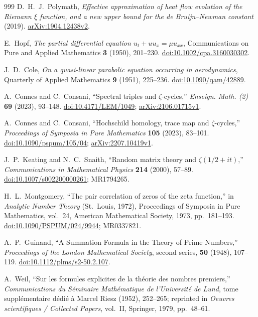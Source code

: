 \begin{thebibliography}{999}
D.~H.~J.~Polymath,
\emph{Effective approximation of heat flow evolution of the Riemann $\xi$
function, and a new upper bound for the de Bruijn--Newman constant} (2019).
\href{https://arxiv.org/abs/1904.12438}{arXiv:1904.12438v2}.

E.~Hopf,
\emph{The partial differential equation $u_t+uu_x=\mu u_{xx}$},
Communications on Pure and Applied Mathematics \textbf{3}
(1950), 201--230.
\href{https://doi.org/10.1002/cpa.3160030302}{doi:10.1002/cpa.3160030302}.

J.~D.~Cole,
\emph{On a quasi-linear parabolic equation occurring in aerodynamics},
Quarterly of Applied Mathematics \textbf{9} (1951), 225--236.
\href{https://doi.org/10.1090/qam/42889}{doi:10.1090/qam/42889}.

A.~Connes and C.~Consani,
``Spectral triples and $\zeta$-cycles,''
\emph{Enseign. Math. (2)} \textbf{69} (2023), 93--148.
\href{https://doi.org/10.4171/LEM/1049}{doi:10.4171/LEM/1049};
\href{https://arxiv.org/abs/2106.01715}{arXiv:2106.01715v1}.

A.~Connes and C.~Consani,
``Hochschild homology, trace map and $\zeta$-cycles,''
\emph{Proceedings of Symposia in Pure Mathematics} \textbf{105} (2023),
83--101.
\href{https://doi.org/10.1090/pspum/105/04}{doi:10.1090/pspum/105/04};
\href{https://arxiv.org/abs/2207.10419}{arXiv:2207.10419v1}.

J.~P.~Keating and N.~C.~Snaith,
``Random matrix theory and $\zeta(1/2+it)$,''
\emph{Communications in Mathematical Physics} \textbf{214} (2000), 57--89.
\href{https://doi.org/10.1007/s002200000261}{doi:10.1007/s002200000261};
MR1794265.

H.~L.~Montgomery,
``The pair correlation of zeros of the zeta function,''
in \emph{Analytic Number Theory} (St.~Louis, 1972),
Proceedings of Symposia in Pure Mathematics, vol.~24,
American Mathematical Society, 1973, pp.~181--193.
\href{https://doi.org/10.1090/PSPUM/024/9944}{doi:10.1090/PSPUM/024/9944};
MR0337821.

A.~P.~Guinand,
``A Summation Formula in the Theory of Prime Numbers,''
\emph{Proceedings of the London Mathematical Society}, second series,
\textbf{50} (1948), 107--119.
\href{https://doi.org/10.1112/plms/s2-50.2.107}{doi:10.1112/plms/s2-50.2.107}.

A.~Weil,
``Sur les formules explicites de la th\'eorie des nombres premiers,''
\emph{Communications du S\'eminaire Math\'ematique de l'Universit\'e de Lund},
tome suppl\'ementaire d\'edi\'e \`a Marcel Riesz (1952), 252--265;
reprinted in \emph{Oeuvres scientifiques / Collected Papers}, vol.~II,
Springer, 1979, pp.~48--61.


\end{thebibliography}
